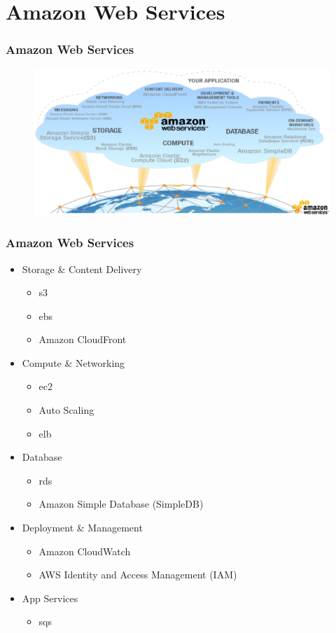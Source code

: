 \documentclass{beamer}
\begin{document}
\section[Amazon Web Services]{Amazon Web Services}
\begin{frame}
\frametitle{Amazon Web Services}
\begin{figure}
  \includegraphics[width= 1.0 \textwidth]{infraestructura-tecnologica-de-amazon-web-services-para-brindar-servicios-cloud-saas-iaas-y-paas.eps}
\end{figure}
\end{frame}
\begin{frame}
\frametitle{Amazon Web Services}
\begin{itemize}
 \item Storage \& Content Delivery
  \begin{itemize}
    \item \gls{s3}
    \item \gls{ebs}
    \item Amazon CloudFront
  \end{itemize}  
\item Compute \& Networking
  \begin{itemize}
    \item \gls{ec2}
    \item Auto Scaling
    \item \gls{elb}
  \end{itemize}
  \item Database
  \begin{itemize}
    \item \gls{rds}
    \item Amazon Simple Database (SimpleDB)
  \end{itemize}
  \item Deployment \& Management
  \begin{itemize}
    \item Amazon CloudWatch
    \item AWS Identity and Access Management (IAM) 
  \end{itemize}
  \item App Services
  \begin{itemize}
    \item \gls{sqs}
  \end{itemize}
\end{itemize}
\end{frame}
\end{document}
